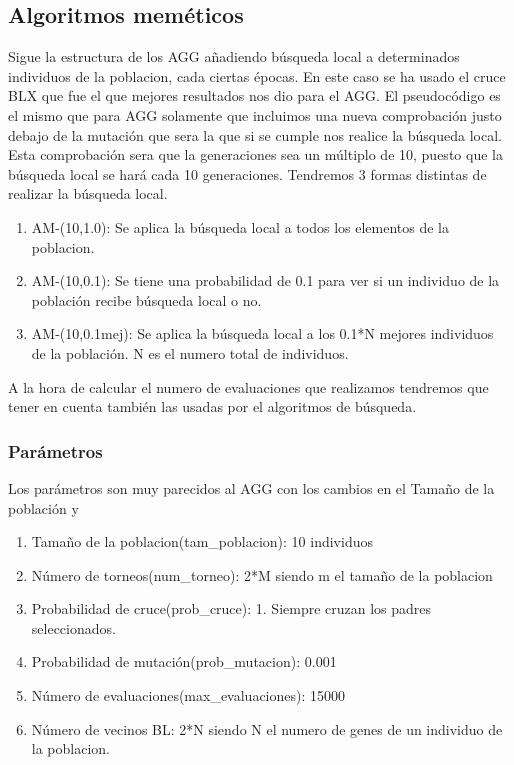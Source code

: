 \documentclass[titlepage]{article}
\begin{document}
	\subsection{Algoritmos meméticos}
	Sigue la estructura de los AGG añadiendo búsqueda local a determinados individuos de la poblacion, cada ciertas épocas. En este caso se ha usado el cruce BLX que fue el que mejores resultados nos dio para el AGG. El pseudocódigo es el mismo que para AGG solamente que incluimos una nueva comprobación justo debajo de la mutación que sera la que si se cumple nos realice la búsqueda local. Esta comprobación sera que la generaciones sea un múltiplo de 10, puesto que la búsqueda local se hará cada 10 generaciones. Tendremos 3 formas distintas de realizar la búsqueda local.
	
	\begin{enumerate}
		\item AM-(10,1.0): Se aplica la búsqueda local a todos los elementos de la poblacion.
		\item AM-(10,0.1): Se tiene una probabilidad de 0.1 para ver si un individuo de la población recibe búsqueda local o no.
		\item AM-(10,0.1mej): Se aplica la búsqueda local a los 0.1*N mejores individuos de la población. N es el numero total de individuos.
	\end{enumerate}

	A la hora de calcular el numero de evaluaciones que realizamos tendremos que tener en cuenta también las usadas por el algoritmos de búsqueda.

	\subsubsection{Parámetros}
	Los parámetros son muy parecidos al AGG con los cambios en el Tamaño de la población y 
	\begin{enumerate}
		\item Tamaño de la poblacion(tam\_poblacion): 10 individuos
		\item Número de torneos(num\_torneo): 2*M siendo m el tamaño de la poblacion
		\item Probabilidad de cruce(prob\_cruce): 1. Siempre cruzan los padres seleccionados.
		\item Probabilidad de mutación(prob\_mutacion): 0.001
		\item Número de evaluaciones(max\_evaluaciones): 15000
		\item Número de vecinos BL: 2*N siendo N el numero de genes de un individuo de la poblacion.
	\end{enumerate}
\end{document}
